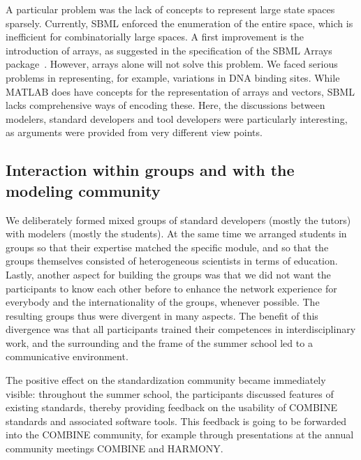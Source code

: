 \documentclass[journal,transmag]{IEEEtran}
\begin{document}
A particular problem was the lack of concepts to represent large state spaces sparsely. Currently, SBML enforced the enumeration of the entire space, which is inefficient for combinatorially large spaces. A first improvement is the introduction of arrays, as suggested in the specification of the SBML Arrays package~\cite{SBMLArray}. However, arrays alone will not solve this problem. 
We faced serious problems in representing, for example, variations in DNA binding sites. 
While MATLAB does have concepts for the representation of arrays and vectors, SBML lacks comprehensive ways of encoding these. 
Here, the discussions between modelers, standard developers and tool developers were particularly interesting, as arguments were provided from very different view points.

\subsection{Interaction within groups and with the modeling community} 
We deliberately formed mixed groups of standard developers (mostly the tutors) with modelers (mostly the students). 
At the same time we arranged students in groups so that their expertise matched the specific module, and so that the groups themselves consisted of heterogeneous scientists in terms of education. 
Lastly, another aspect for building the groups was that we did not want the participants to know each other before to enhance the network experience for everybody and the internationality of the groups, whenever possible. 
The resulting groups thus were divergent in many aspects. 
The benefit of this divergence was that all participants trained their competences in interdisciplinary work, and the surrounding and the frame of the summer school led to a communicative environment. 

The positive effect on the standardization community became immediately visible:
throughout the summer school, the participants discussed features of existing standards, thereby providing feedback on the usability of COMBINE standards and associated software tools.
This feedback is going to be forwarded into the COMBINE community, for example through presentations at the annual community meetings COMBINE and HARMONY.
\end{document}

